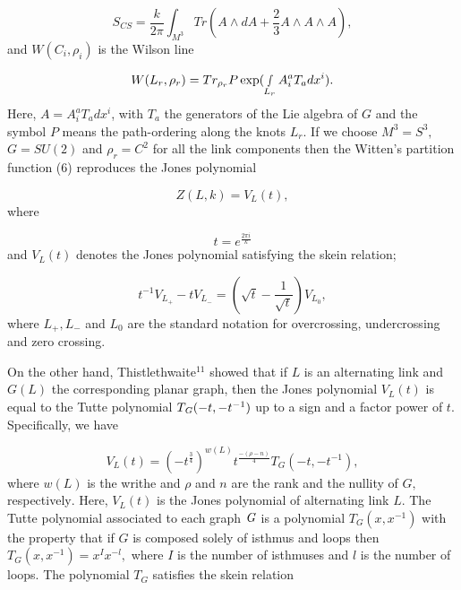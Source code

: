 \documentclass[a4paper,12pt]{article}
\begin{document}
\begin{equation}
S_{CS}=\frac{k}{2\pi }\int_{M^{3}}Tr(A\wedge dA+\frac{2}{3}A\wedge A\wedge
A),  \label{7}
\end{equation}
and $W(C_i,\rho _i)$ is the Wilson line

\begin{equation}
W(L_{r},\rho _{r})=Tr_{\rho _{r}}P\exp (\smallint
_{L_{r}}A_{i}^{a}T_{a}dx^{i}).  \label{8}
\end{equation}
Here, $A=A_{i}^{a}T_{a}dx^{i}$, with $T_{a}$ the generators of the Lie
algebra of $G$ and the symbol $P$ means the path-ordering along the knots $%
L_{r}.$ If we choose $M^{3}=S^{3},$ $G=SU(2)$ and $\rho _{r}=C^{2}$ for all
the link components then the Witten's partition function (6) reproduces the
Jones polynomial

\begin{equation}
Z(L,k)=V_{L}(t),  \label{9}
\end{equation}
where

\begin{equation}
t=e^{\frac{2\pi i}{k}}  \label{10}
\end{equation}
and $V_{L}(t)$ denotes the Jones polynomial satisfying the skein relation;

\begin{equation}
t^{-1}V_{L_{+}}-tV_{L_{-}}=(\sqrt{t}-\frac{1}{\sqrt{t}})V_{L_{0}},
\label{11}
\end{equation}
where $L_{+},L_{-}$ and $L_{0}$ are the standard notation for overcrossing,
undercrossing and zero crossing.

On the other hand, Thistlethwaite$^{11}$ showed that if $L$ is an
alternating link and $\mathit{G}(L)$ the corresponding planar graph, then
the Jones polynomial $V_{L}(t)$ is equal to the Tutte polynomial $T_{\mathit{%
G}}(-t,-t^{-1})$ up to a sign and a factor power of $t.$ Specifically, we
have

\begin{equation}
V_{L}(t)=(-t^{\frac{3}{4}})^{w(L)}t^{\frac{-(\rho -n)}{4}}T_{\mathit{G}%
}(-t,-t^{-1}),  \label{12}
\end{equation}
where $w(L)$ is the writhe and $\rho $ and $n$ are the rank and the nullity
of $\mathit{G,}$ respectively$.$ Here, $V_{L}(t)$ is the Jones polynomial of
alternating link $L.$ The Tutte polynomial associated to each graph $\mathit{%
G}$ is a polynomial $T_{\mathit{G}}(x,x^{-1})$ with the property that if $%
\mathit{G}$ is composed solely of isthmus and loops then $T_{\mathit{G}%
}(x,x^{-1})=x^{I}x^{-l},$ where $I$ is the number of isthmuses and $l$ is
the number of loops. The polynomial $T_{\mathit{G}}$ satisfies the skein
relation
\end{document}
